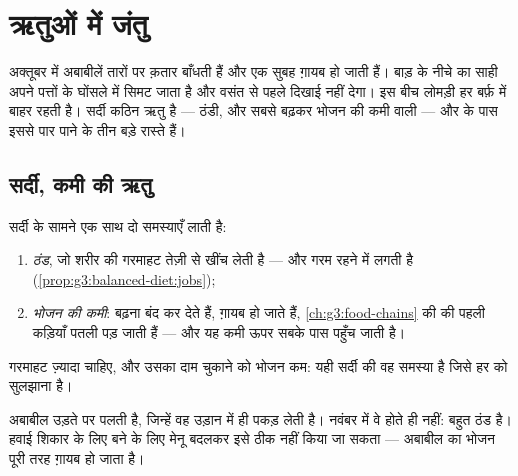 \chapter{ऋतुओं में जंतु}\label{ch:g3:animals-through-seasons}

अक्तूबर में अबाबीलें तारों पर क़तार बाँधती हैं और एक सुबह ग़ायब हो जाती
हैं। बाड़ के नीचे का साही अपने पत्तों के घोंसले में सिमट जाता है और
वसंत से पहले दिखाई नहीं देगा। इस बीच लोमड़ी हर बर्फ़ में बाहर रहती है।
सर्दी कठिन ऋतु है --- ठंडी, और सबसे बढ़कर भोजन की कमी वाली --- और
 के पास इससे पार पाने के तीन बड़े रास्ते हैं।

\section{सर्दी, कमी की ऋतु}

\begin{proposition}[सर्दी की दोहरी समस्या]\label{prop:g3:animals-through-seasons:problem}
सर्दी  के सामने एक साथ दो समस्याएँ लाती है:
\begin{enumerate}
  \item \emph{ठंड}, जो शरीर की गरमाहट तेज़ी से खींच लेती है ---
        और गरम रहने में  लगती है
        (\cref{prop:g3:balanced-diet:jobs});
  \item \emph{भोजन की कमी}:  बढ़ना बंद कर देते हैं,  ग़ायब हो
        जाते हैं, \cref{ch:g3:food-chains} की  की पहली
        कड़ियाँ पतली पड़ जाती हैं --- और यह कमी ऊपर सबके पास पहुँच
        जाती है।
\end{enumerate}
गरमाहट ज़्यादा चाहिए, और उसका दाम चुकाने को भोजन कम: यही सर्दी की वह
समस्या है जिसे हर  को सुलझाना है।
\end{proposition}
\admitted

\begin{example}[कीट खाने वालों का भोजन कहाँ गया?]\label{ex:g3:animals-through-seasons:insects}
अबाबील उड़ते  पर पलती है, जिन्हें वह उड़ान में ही पकड़ लेती है।
नवंबर में वे होते ही नहीं: बहुत ठंड है। हवाई शिकार के लिए बने  के
लिए मेनू बदलकर इसे ठीक नहीं किया जा सकता --- अबाबील का भोजन पूरी तरह
ग़ायब हो जाता है।
\end{example}


